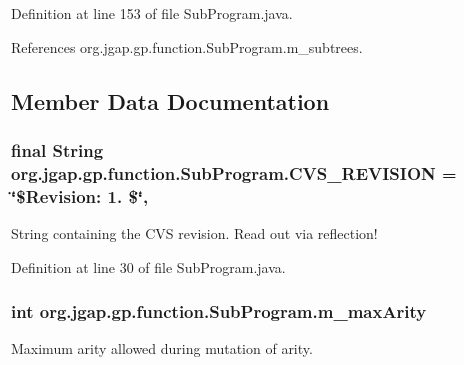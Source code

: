 Definition at line 153 of file Sub\-Program.\-java.



References org.\-jgap.\-gp.\-function.\-Sub\-Program.\-m\-\_\-subtrees.



\subsection{Member Data Documentation}
\hypertarget{classorg_1_1jgap_1_1gp_1_1function_1_1_sub_program_a7324753f18015392cd7c107e4e23ce98}{
\subsubsection[{C\-V\-S\-\_\-\-R\-E\-V\-I\-S\-I\-O\-N}]{\setlength{\rightskip}{0pt plus 5cm}final String org.\-jgap.\-gp.\-function.\-Sub\-Program.\-C\-V\-S\-\_\-\-R\-E\-V\-I\-S\-I\-O\-N = \char`\"{}\$Revision\-: 1. \$\char`\"{}\hspace{0.3cm}{\ttfamily [static]}, {\ttfamily [private]}}}\label{classorg_1_1jgap_1_1gp_1_1function_1_1_sub_program_a7324753f18015392cd7c107e4e23ce98}
String containing the C\-V\-S revision. Read out via reflection! 

Definition at line 30 of file Sub\-Program.\-java.

\hypertarget{classorg_1_1jgap_1_1gp_1_1function_1_1_sub_program_a6751e1fc9048b69669880c52719c1312}{
\subsubsection[{m\-\_\-max\-Arity}]{\setlength{\rightskip}{0pt plus 5cm}int org.\-jgap.\-gp.\-function.\-Sub\-Program.\-m\-\_\-max\-Arity\hspace{0.3cm}{\ttfamily [private]}}}\label{classorg_1_1jgap_1_1gp_1_1function_1_1_sub_program_a6751e1fc9048b69669880c52719c1312}
Maximum arity allowed during mutation of arity. 

